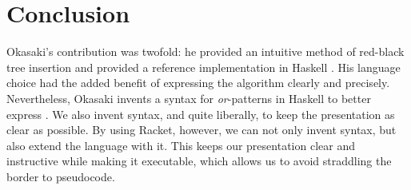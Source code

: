 \documentclass[preprint]{sigplanconf}
\begin{document}
\section{Conclusion}

Okasaki's contribution was twofold: he provided an intuitive method of red-black tree insertion and provided a reference implementation in Haskell \cite{hudak1992report}. His language choice had the added benefit of expressing the algorithm clearly and precisely. Nevertheless, Okasaki invents a syntax for \emph{or}-patterns in Haskell to better express . We also invent syntax, and quite liberally, to keep the presentation as clear as possible. By using Racket, however, we can not only invent syntax, but also extend the language with it. This keeps our presentation clear and instructive while making it executable, which allows us to avoid straddling the border to pseudocode.










\end{document}

